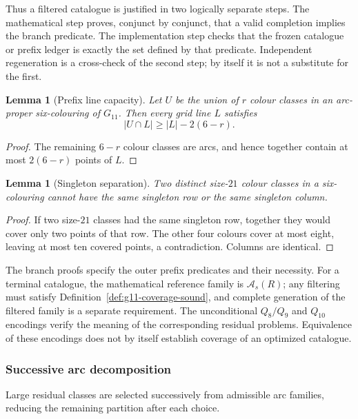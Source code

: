 \documentclass[11pt]{article}
\newtheorem{lemma}[theorem]{Lemma}
\theoremstyle{definition}
\theoremstyle{remark}
\renewcommand{\ge}{\geqslant}
\begin{document}
Thus a filtered catalogue is justified in two logically separate steps.  The
mathematical step proves, conjunct by conjunct, that a valid completion implies
the branch predicate.  The implementation step checks that the frozen
catalogue or prefix ledger is exactly the set defined by that predicate.
Independent regeneration is a cross-check of the second step; by itself it is
not a substitute for the first.

\begin{lemma}[Prefix line capacity]\label{lem:g11-prefix-capacity}
Let \(U\) be the union of \(r\) colour classes in an arc-proper
six-colouring of \(G_{11}\).  Then every grid line \(L\) satisfies
\[
  |U\cap L|\ge |L|-2(6-r).
\]
\end{lemma}
\begin{proof}
The remaining \(6-r\) colour classes are arcs, and hence together contain
at most \(2(6-r)\) points of \(L\).
\end{proof}

\begin{lemma}[Singleton separation]\label{lem:g11-singleton-separation}
Two distinct size-\(21\) colour classes in a six-colouring cannot have the
same singleton row or the same singleton column.
\end{lemma}
\begin{proof}
If two size-\(21\) classes had the same singleton row, together they would
cover only two points of that row.  The other four colours cover at most eight,
leaving at most ten covered points, a contradiction.  Columns are identical.
\end{proof}

The branch proofs specify the outer prefix predicates and their necessity.
For a terminal catalogue, the mathematical reference family is
\(\mathcal A_s(R)\); any filtering must satisfy
Definition~\ref{def:g11-coverage-sound}, and complete generation of the
filtered family is a separate requirement.
The unconditional \(Q_8/Q_9\) and \(Q_{10}\) encodings verify the
meaning of the corresponding residual problems.  Equivalence of these
encodings does not by itself establish coverage of an optimized catalogue.

\subsubsection{Successive arc decomposition}

Large residual classes are selected successively from admissible
arc families, reducing the remaining partition after each choice.
\end{document}
